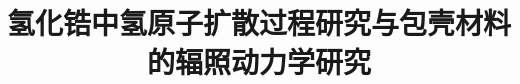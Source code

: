 
\title{氢化锆中氢原子扩散过程研究与包壳材料的辐照动力学研究}
\author[ ]{}   %
\renewcommand*{\Authfont}{\small\rm} %
\renewcommand*{\Affilfont}{\small\it} %
\renewcommand\Authands{ and } %
\renewcommand\Authands{ , } %
\date{} %


